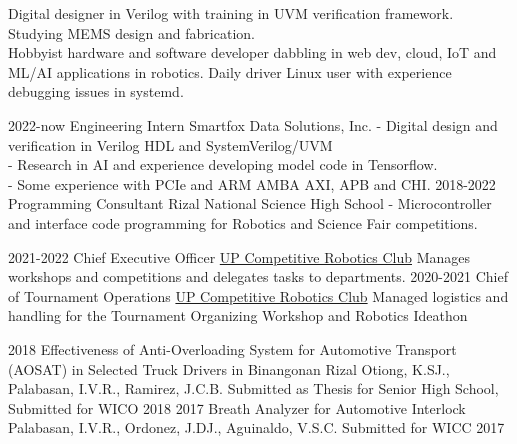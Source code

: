\documentclass[9pt]{developercv}
\begin{document}
\begin{minipage}[t]{0.475\textwidth} 
	\vspace{-\baselineskip}

	Digital designer in Verilog with training in UVM verification framework. Studying MEMS design and fabrication. \\

	Hobbyist hardware and software developer dabbling in web dev, cloud, IoT and ML/AI applications in robotics. Daily driver Linux user with experience debugging issues in systemd.


	\begin{entrylist}
		\entry
			{2022-now}
			{Engineering Intern}
			{Smartfox Data Solutions, Inc.}
			{
				- Digital design and verification in Verilog HDL and SystemVerilog/UVM \\
				- Research in AI and experience developing model code in Tensorflow. \\
				- Some experience with PCIe and ARM AMBA AXI, APB and CHI.
			}	
		\entry
			{2018-2022}
			{Programming Consultant}
			{Rizal National Science High School}
			{
				- Microcontroller and interface code programming for Robotics and Science Fair competitions.
			}
	\end{entrylist}
	\cvsect{Organizations}
	\begin{entrylist}
		\entry
			{2021-2022}
			{Chief Executive Officer}
			{\href{https://upcrc.org}{UP Competitive Robotics Club}}
			{Manages workshops and competitions and delegates tasks to departments.}
		\entry
			{2020-2021}
			{Chief of Tournament Operations}
			{\href{https://upcrc.org}{UP Competitive Robotics Club}}
			{Managed logistics and handling for the Tournament Organizing Workshop and Robotics Ideathon}
	\end{entrylist}
	\cvsect{Publications}
	\begin{entrylist}
		\entry
			{2018}
			{Effectiveness of Anti-Overloading System for Automotive Transport (AOSAT) in Selected Truck Drivers in Binangonan Rizal}
			{Otiong, K.SJ., Palabasan, I.V.R., Ramirez, J.C.B.}
			{Submitted as Thesis for Senior High School, Submitted for WICO 2018}
		\entry
			{2017}
			{Breath Analyzer for Automotive Interlock}
			{Palabasan, I.V.R., Ordonez, J.DJ., Aguinaldo, V.S.C.}
			{Submitted for WICC 2017}
	\end{entrylist}

\end{minipage}
\hfill 
\end{document}
